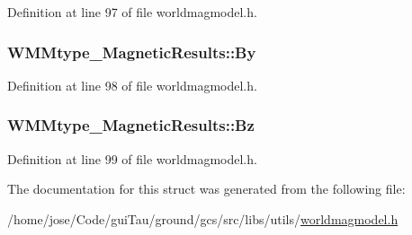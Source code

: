 Definition at line 97 of file worldmagmodel.\-h.

\hypertarget{struct_w_m_mtype___magnetic_results_a6286c091a759e02d19c27d928e391eff}{
\subsubsection[{By}]{ W\-M\-Mtype\-\_\-\-Magnetic\-Results\-::\-By}}\label{struct_w_m_mtype___magnetic_results_a6286c091a759e02d19c27d928e391eff}


Definition at line 98 of file worldmagmodel.\-h.

\hypertarget{struct_w_m_mtype___magnetic_results_a7b18c4cd4a4e446b117fff1f842cee83}{
\subsubsection[{Bz}]{ W\-M\-Mtype\-\_\-\-Magnetic\-Results\-::\-Bz}}\label{struct_w_m_mtype___magnetic_results_a7b18c4cd4a4e446b117fff1f842cee83}


Definition at line 99 of file worldmagmodel.\-h.



The documentation for this struct was generated from the following file\-:\begin{DoxyCompactItemize}
\item 
/home/jose/\-Code/gui\-Tau/ground/gcs/src/libs/utils/\hyperlink{worldmagmodel_8h}{worldmagmodel.\-h}\end{DoxyCompactItemize}
